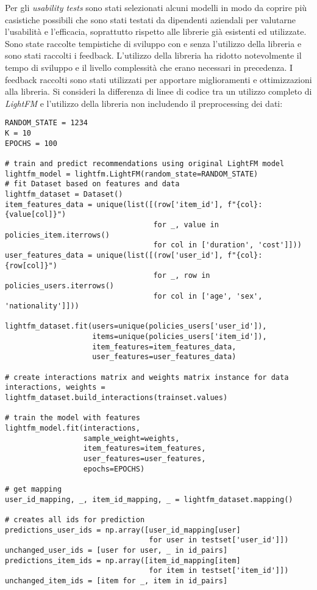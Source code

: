 Per gli \textit{usability tests} sono stati selezionati alcuni modelli in modo da coprire più casistiche possibili che sono stati testati da dipendenti aziendali per valutarne l'usabilità e l'efficacia, soprattutto rispetto alle librerie già esistenti ed utilizzate. Sono state raccolte tempistiche di sviluppo con e senza l'utilizzo della libreria e sono stati raccolti i feedback. L'utilizzo della libreria ha ridotto notevolmente il tempo di sviluppo e il livello complessità che erano necessari in precedenza. I feedback raccolti sono stati utilizzati per apportare miglioramenti e ottimizzazioni alla libreria. Si consideri la differenza di linee di codice tra un utilizzo completo di \textit{LightFM} e l'utilizzo della libreria non includendo il preprocessing dei dati:

\begin{lstlisting}[caption=esempio di utilizzo completo della libreria \textit{LightFM}]
RANDOM_STATE = 1234
K = 10
EPOCHS = 100

# train and predict recommendations using original LightFM model
lightfm_model = lightfm.LightFM(random_state=RANDOM_STATE)
# fit Dataset based on features and data
lightfm_dataset = Dataset()
item_features_data = unique(list([(row['item_id'], f"{col}:{value[col]}") 
                                  for _, value in policies_item.iterrows() 
                                  for col in ['duration', 'cost']]))
user_features_data = unique(list([(row['user_id'], f"{col}:{row[col]}")
                                  for _, row in policies_users.iterrows() 
                                  for col in ['age', 'sex', 'nationality']]))

lightfm_dataset.fit(users=unique(policies_users['user_id']),
                    items=unique(policies_users['item_id']),
                    item_features=item_features_data,
                    user_features=user_features_data)

# create interactions matrix and weights matrix instance for data
interactions, weights = lightfm_dataset.build_interactions(trainset.values)

# train the model with features
lightfm_model.fit(interactions,
                  sample_weight=weights,
                  item_features=item_features,
                  user_features=user_features,
                  epochs=EPOCHS)

# get mapping
user_id_mapping, _, item_id_mapping, _ = lightfm_dataset.mapping()

# creates all ids for prediction
predictions_user_ids = np.array([user_id_mapping[user] 
                                 for user in testset['user_id']])
unchanged_user_ids = [user for user, _ in id_pairs]
predictions_item_ids = np.array([item_id_mapping[item] 
                                 for item in testset['item_id']])
unchanged_item_ids = [item for _, item in id_pairs]


\end{lstlisting}
